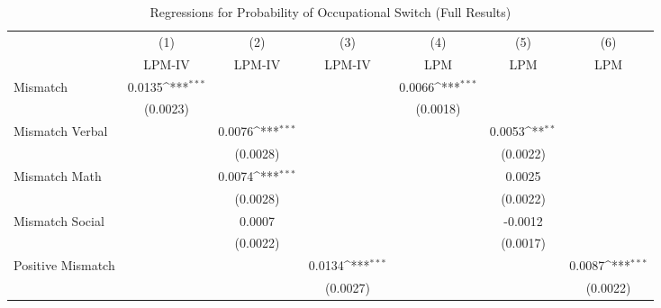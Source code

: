 {
\def\sym#1{\ifmmode^{#1}\else\(^{#1}\)\fi}
\begin{longtable}{l*{6}{c}}
\caption{Regressions for Probability of Occupational Switch (Full Results)}\\
\hline  \endfirsthead\hline  \endhead\hline  \endfoot\endlastfoot
                    &\multicolumn{1}{c}{(1)}&\multicolumn{1}{c}{(2)}&\multicolumn{1}{c}{(3)}&\multicolumn{1}{c}{(4)}&\multicolumn{1}{c}{(5)}&\multicolumn{1}{c}{(6)}\\
                    &\multicolumn{1}{c}{LPM-IV}&\multicolumn{1}{c}{LPM-IV}&\multicolumn{1}{c}{LPM-IV}&\multicolumn{1}{c}{LPM}&\multicolumn{1}{c}{LPM}&\multicolumn{1}{c}{LPM}\\
\hline  
Mismatch            &      0.0135\sym{***}&                     &                     &      0.0066\sym{***}&                     &                     \\
                    &    (0.0023)         &                     &                     &    (0.0018)         &                     &                     \\
Mismatch Verbal     &                     &      0.0076\sym{***}&                     &                     &      0.0053\sym{**} &                     \\
                    &                     &    (0.0028)         &                     &                     &    (0.0022)         &                     \\
Mismatch Math       &                     &      0.0074\sym{***}&                     &                     &      0.0025         &                     \\
                    &                     &    (0.0028)         &                     &                     &    (0.0022)         &                     \\
Mismatch Social     &                     &      0.0007         &                     &                     &     -0.0012         &                     \\
                    &                     &    (0.0022)         &                     &                     &    (0.0017)         &                     \\
Positive Mismatch   &                     &                     &      0.0134\sym{***}&                     &                     &      0.0087\sym{***}\\
                    &                     &                     &    (0.0027)         &                     &                     &    (0.0022)         \\

\end{longtable}}
